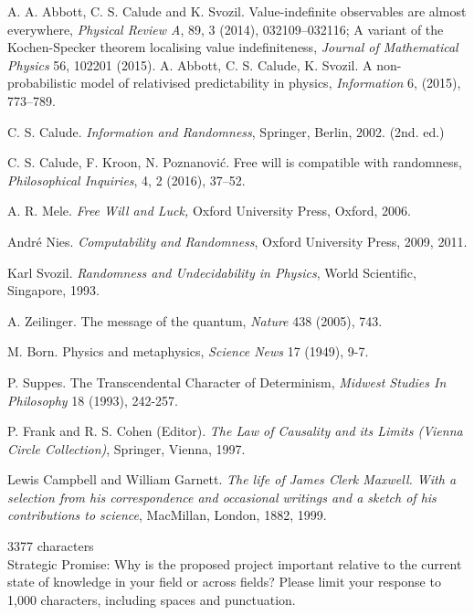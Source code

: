 \documentclass[11pt,  a4paper]{article}
\begin{document}
\begin{thebibliography}{99}
  A. A. Abbott,  C. S. Calude  and  K. Svozil.
 Value-indefinite observables are almost everywhere, {\em Physical Review A}, 89, 3 (2014), 032109--032116; %
%
 A variant of the Kochen-Specker theorem localising value indefiniteness, {\em Journal of Mathematical Physics} 56, 102201 (2015).
  A. Abbott, C. S. Calude, K. Svozil. A non-probabilistic model of relativised predictability in physics, {\em Information}  6, (2015), 773--789.

  C. S. Calude. {\em Information and Randomness},  Springer, Berlin, 2002. (2nd. ed.)

 C. S. Calude, F. Kroon, N. Poznanovi\'{c}. Free will is compatible with randomness, {\em Philosophical Inquiries}, 4, 2 (2016), 37--52.

 A. R. Mele. {\em Free Will and Luck,} Oxford University Press, Oxford,  2006.

 Andr\'e Nies. {\em Computability and Randomness},  Oxford University Press, 2009, 2011.

 Karl Svozil. {\em Randomness and Undecidability in Physics}, World Scientific, Singapore, 1993.

 A. Zeilinger. The message of the quantum,
{\em Nature} 438 (2005), 743.

 M. Born. Physics and metaphysics,
{\em Science News}  17 (1949), 9-7.

 P. Suppes. The Transcendental Character of Determinism,
{\em Midwest Studies In Philosophy} 18 (1993), 242-257.

  P. Frank and {R. S. Cohen (Editor)}. {\em The Law of Causality and its Limits (Vienna Circle Collection)},
Springer, Vienna, 1997.

  Lewis Campbell and William Garnett. {\em The life of {J}ames {C}lerk {M}axwell. {W}ith a selection from his correspondence and occasional writings and a sketch of his contributions to science},
MacMillan, London, 1882, 1999.


\end{thebibliography}

{\color{red} 3377 characters}\\

{\small \color{blue} \noindent  Strategic Promise: Why is the proposed project important relative to the current state of knowledge in your field or across fields? Please limit your response to 1,000 characters, including spaces and punctuation.}\\
\end{document}
